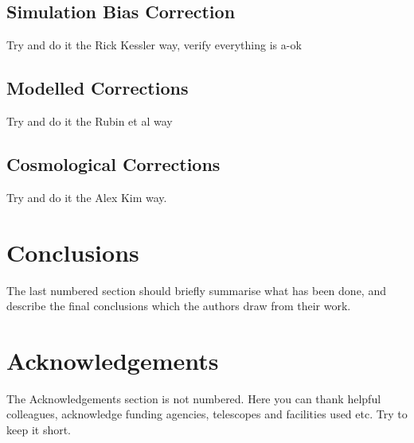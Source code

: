\documentclass[a4paper,fleqn,usenatbib]{mnras}
\begin{document}
\subsection{Simulation Bias Correction}

Try and do it the Rick Kessler way, verify everything is a-ok

\subsection{Modelled Corrections}

Try and do it the Rubin et al way

\subsection{Cosmological Corrections}

Try and do it the Alex Kim way.


\section{Conclusions}

The last numbered section should briefly summarise what has been done, and describe
the final conclusions which the authors draw from their work.

\section*{Acknowledgements}

The Acknowledgements section is not numbered. Here you can thank helpful
colleagues, acknowledge funding agencies, telescopes and facilities used etc.
Try to keep it short.













\bsp	%
\label{lastpage}
\end{document}
